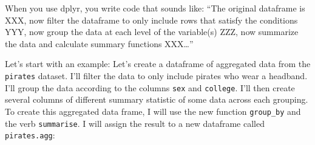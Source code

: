 \documentclass[]{book}
\newenvironment{Shaded}{\begin{snugshade}}{\end{snugshade}}
\newcommand{\KeywordTok}[1]{\textcolor[rgb]{0.13,0.29,0.53}{\textbf{{#1}}}}
\newcommand{\DataTypeTok}[1]{\textcolor[rgb]{0.13,0.29,0.53}{{#1}}}
\newcommand{\StringTok}[1]{\textcolor[rgb]{0.31,0.60,0.02}{{#1}}}
\newcommand{\CommentTok}[1]{\textcolor[rgb]{0.56,0.35,0.01}{\textit{{#1}}}}
\newcommand{\NormalTok}[1]{{#1}}
\theoremstyle{definition}
\theoremstyle{definition}
\theoremstyle{remark}
\begin{document}
When you use dplyr, you write code that sounds like: ``The original
dataframe is XXX, now filter the dataframe to only include rows that
satisfy the conditions YYY, now group the data at each level of the
variable(s) ZZZ, now summarize the data and calculate summary functions
XXX\ldots{}''

Let's start with an example: Let's create a dataframe of aggregated data
from the \texttt{pirates} dataset. I'll filter the data to only include
pirates who wear a headband. I'll group the data according to the
columns \texttt{sex} and \texttt{college}. I'll then create several
columns of different summary statistic of some data across each
grouping. To create this aggregated data frame, I will use the new
function \texttt{group\_by} and the verb \texttt{summarise}. I will
assign the result to a new dataframe called \texttt{pirates.agg}:

\begin{Shaded}
\end{Shaded}
\end{document}
